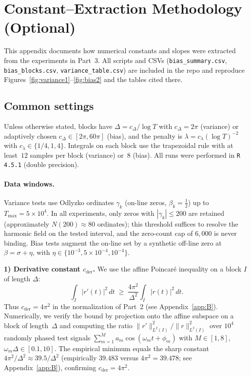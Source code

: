 \section{Constant–Extraction Methodology (Optional)}
\label{app:C}

This appendix documents how numerical constants and slopes were extracted from the
experiments in Part~3.  All scripts and CSVs (\texttt{bias\_summary.csv},
\texttt{bias\_blocks.csv}, \texttt{variance\_table.csv}) are included in the repo and
reproduce Figures~\ref{fig:variance1}–\ref{fig:bias2} and the tables cited there.

\subsection*{Common settings}
Unless otherwise stated, blocks have
$\Delta=c_\Delta/\log T$ with $c_\Delta=2\pi$ (variance) or
adaptively chosen $c_\Delta\in[2\pi,60\pi]$ (bias),
and the penalty is $\lambda=c_\lambda(\log T)^{-2}$ with $c_\lambda\in\{1/4,1,4\}$.
Integrals on each block use the trapezoidal rule with at least~$12$ samples per block
(variance) or~$8$ (bias).
All runs were performed in \texttt{R 4.5.1} (double precision).

\paragraph{Data windows.}
Variance tests use Odlyzko ordinates $\gamma_k$ (on-line zeros, $\beta_k=\tfrac12$)
up to $T_{\max}=5\times10^4$.  In all experiments, only zeros with
$|\gamma_k|\le 200$ are retained (approximately $N(200)\approx 80$ ordinates);
this threshold suffices to resolve the harmonic field on the tested interval,
and the zero-count cap of $6{,}000$ is never binding.
Bias tests augment the on-line set by a synthetic
off-line zero at $\beta=\sigma+\eta$, with $\eta\in\{10^{-3},5\!\times\!10^{-4},10^{-4}\}$.

\medskip
\noindent\textbf{1) Derivative constant $c_{\mathrm{der}}$.}
We use the affine Poincaré inequality on a block $I$ of length $\Delta$:
\[
\int_I |r'(t)|^2\,dt \;\ge\; \frac{4\pi^2}{\Delta^2}\int_I |r(t)|^2\,dt.
\]
Thus $c_{\mathrm{der}}=4\pi^2$ in the normalization of Part~2
(see Appendix~\ref{app:B}).  Numerically, we verify the bound by
projection onto the affine subspace on a block of length~$\Delta$
and computing the ratio
$\|r'\|_{L^2(I)}^2 / \|r\|_{L^2(I)}^2$ over $10^4$ randomly phased test
signals $\sum_{m=1}^M a_m\cos(\omega_m t+\phi_m)$ with $M\in[1,8]$,
$\omega_m\Delta\in[0.1,10]$.  The empirical minimum equals the sharp
constant $4\pi^2/\Delta^2\approx 39.5/\Delta^2$ (empirically $39.483$ versus
$4\pi^2=39.478$; see Appendix~\ref{app:B}), confirming $c_{\mathrm{der}}=4\pi^2$.

